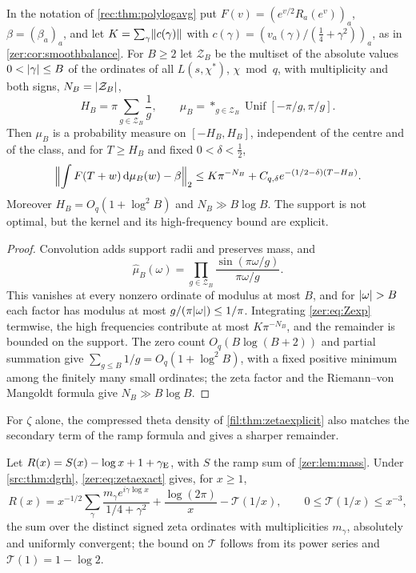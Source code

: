 \begin{remark}\label{zer:thm:kernel}
In the notation of \cref{rec:thm:polylogavg} put $F(v)=(e^{v/2}R_a(e^v))_{a}$, $\beta=(\beta_a)_a$, and let
$K=\sum_\gamma\lVert c(\gamma)\rVert$ with $c(\gamma)=(v_a(\gamma)/(\tfrac14+\gamma^2))_a$, as in \cref{zer:cor:smoothbalance}.
For $B\ge2$ let $\mathcal Z_B$ be the multiset of the absolute values $0<\lvert\gamma\rvert\le B$ of the
ordinates of all $L(s,\chi^*)$, $\chi\bmod q$, with multiplicity and both signs, $N_B=\lvert\mathcal Z_B\rvert$,
\[
 H_B=\pi\sum_{g\in\mathcal Z_B}\frac1g,\qquad
 \mu_B=\mathop{\ast}_{g\in\mathcal Z_B}\operatorname{Unif}[-\pi/g,\pi/g].
\]
Then $\mu_B$ is a probability measure on $[-H_B,H_B]$, independent of the centre and of the class, and
for $T\ge H_B$ and fixed $0<\delta<\tfrac12$,
\[
 \Bigl\|\int F(T+w)\,\mathrm{d}\mu_B(w)-\beta\Bigr\|_2\le K\pi^{-N_B}+C_{q,\delta}e^{-(1/2-\delta)(T-H_B)}.
\]
Moreover $H_B=O_q(1+\log^2B)$ and $N_B\gg B\log B$. The support is not optimal, but the kernel and its
high-frequency bound are explicit.
\end{remark}
\begin{proof}
Convolution adds support radii and preserves mass, and
\[
 \widehat\mu_B(\omega)=\prod_{g\in\mathcal Z_B}\frac{\sin(\pi\omega/g)}{\pi\omega/g}.
\]
This vanishes at every
nonzero ordinate of modulus at most $B$, and for $\lvert\omega\rvert>B$ each factor has modulus at most
$g/(\pi\lvert\omega\rvert)\le1/\pi$. Integrating \eqref{zer:eq:Zexp} termwise, the high frequencies
contribute at most $K\pi^{-N_B}$, and the remainder is bounded on the support. The zero count
$O_q(B\log(B+2))$ and partial summation give $\sum_{g\le B}1/g=O_q(1+\log^2B)$, with a fixed
positive minimum among the finitely many small ordinates; the zeta factor and the
Riemann--von Mangoldt formula give $N_B\gg B\log B$.
\end{proof}

For $\zeta$ alone, the compressed theta density of \cref{fil:thm:zetaexplicit} also matches the secondary term of
the ramp formula and gives a sharper remainder.

\begin{remark}\label{fil:lem:zetaramp}
Let $R(x)=S(x)-\log x+1+\gamma_{\mathrm{E}}$, with $S$ the ramp sum of \cref{zer:lem:mass}. Under \cref{src:thm:dgrh},
\eqref{zer:eq:zetaexact} gives, for $x\ge1$,
\[
 R(x)=x^{-1/2}\sum_\gamma\frac{m_\gamma e^{i\gamma\log x}}{1/4+\gamma^2}+\frac{\log(2\pi)}x-\mathcal T(1/x),\qquad
 0\le\mathcal T(1/x)\le x^{-3},
\]
the sum over the distinct signed zeta ordinates with multiplicities $m_\gamma$, absolutely and uniformly
convergent; the bound on $\mathcal T$ follows from its power series and $\mathcal T(1)=1-\log2$.
\end{remark}

